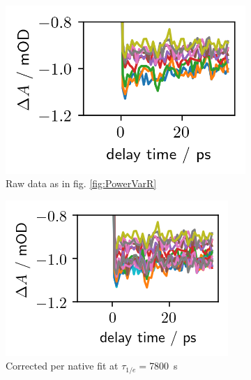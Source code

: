 \documentclass[twoside,openright]{scrreprt}
\begin{document}
{\begin{figure}[hbtp]
\centering
\begin{subfigure}[t]{0.3215\linewidth}
\centering
\includegraphics[width=\columnwidth]{images/PowerVarHigh_Raw.png}
\caption{Raw data as in fig. \ref{fig:PowerVarR}}
\end{subfigure}
\hfill
\begin{subfigure}[t]{0.3215\linewidth}
\centering
\includegraphics[width=\columnwidth]{images/PowerVarHigh_CorrNative7800.png} 
\caption{Corrected per native fit at $\tau_{1/e}=$\SI{7800}{\second}}
\end{subfigure}
\hfill
\begin{subfigure}[t]{0.3215\linewidth}
\centering

\end{subfigure}
\end{figure}}
\end{document}

